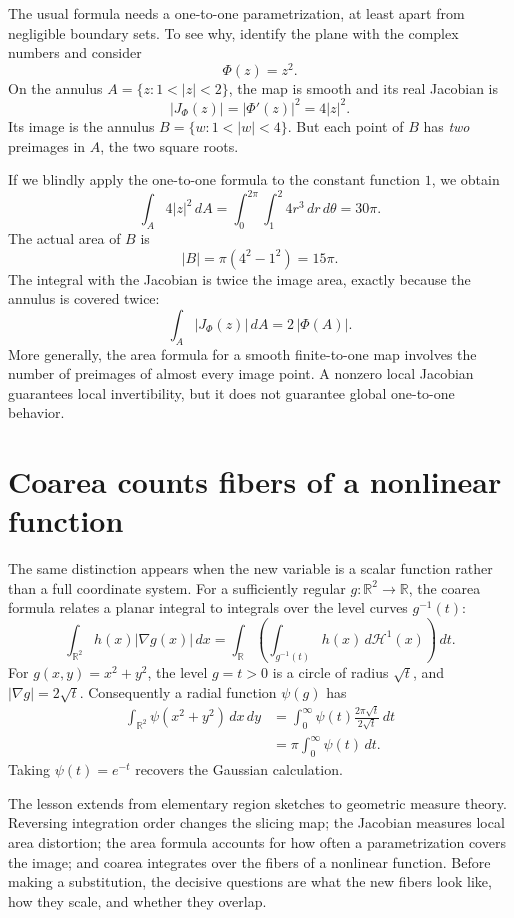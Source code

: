 The usual formula needs a one-to-one parametrization, at least apart from negligible boundary sets. To see why, identify the plane with the complex numbers and consider
\[
 \Phi(z)=z^2.
\]
On the annulus \(A=\{z:1<|z|<2\}\), the map is smooth and its real Jacobian is
\[
 |J_\Phi(z)|=|\Phi'(z)|^2=4|z|^2.
\]
Its image is the annulus \(B=\{w:1<|w|<4\}\). But each point of \(B\) has \emph{two} preimages in \(A\), the two square roots.

If we blindly apply the one-to-one formula to the constant function \(1\), we obtain
\[
 \int_A4|z|^2\,dA
 =\int_0^{2\pi}\int_1^2 4r^3\,dr\,d\theta
 =30\pi.
\]
The actual area of \(B\) is
\[
 |B|=\pi(4^2-1^2)=15\pi.
\]
The integral with the Jacobian is twice the image area, exactly because the annulus is covered twice:
\[
 \boxed{\int_A|J_\Phi(z)|\,dA=2\,|\Phi(A)|.}
\]
More generally, the area formula for a smooth finite-to-one map involves the number of preimages of almost every image point. A nonzero local Jacobian guarantees local invertibility, but it does not guarantee global one-to-one behavior.

\section{Coarea counts fibers of a nonlinear function}

The same distinction appears when the new variable is a scalar function rather than a full coordinate system. For a sufficiently regular \(g:\mathbb R^2\to\mathbb R\), the coarea formula relates a planar integral to integrals over the level curves \(g^{-1}(t)\):
\[
 \int_{\mathbb R^2}h(x)|\nabla g(x)|\,dx
 =\int_{\mathbb R}
       \left(\int_{g^{-1}(t)}h(x)\,d\mathcal H^1(x)\right)\,dt.
\]
For \(g(x,y)=x^2+y^2\), the level \(g=t>0\) is a circle of radius \(\sqrt t\), and \(|\nabla g|=2\sqrt t\). Consequently a radial function \(\psi(g)\) has
\[
\begin{aligned}
 \int_{\mathbb R^2}\psi(x^2+y^2)\,dx\,dy
 &=\int_0^\infty\psi(t)
     \frac{2\pi\sqrt t}{2\sqrt t}\,dt\\
 &=\boxed{\pi\int_0^\infty\psi(t)\,dt}.
\end{aligned}
\]
Taking \(\psi(t)=e^{-t}\) recovers the Gaussian calculation.

The lesson extends from elementary region sketches to geometric measure theory. Reversing integration order changes the slicing map; the Jacobian measures local area distortion; the area formula accounts for how often a parametrization covers the image; and coarea integrates over the fibers of a nonlinear function. Before making a substitution, the decisive questions are what the new fibers look like, how they scale, and whether they overlap.
